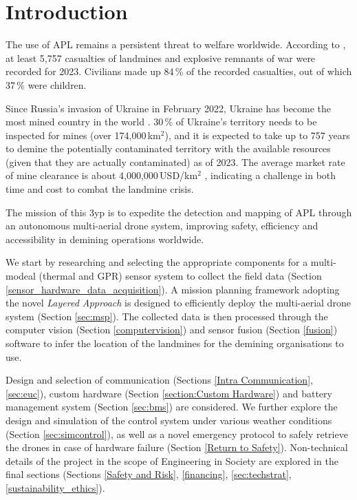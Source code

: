 \section{Introduction} \label{introduction}

The use of \gls{APL} remains a persistent threat to welfare worldwide. According to \cite{icbl2024landmine}, at least 5,757 casualties of landmines and explosive remnants of war were recorded for 2023. Civilians made up 84\,\% of the recorded casualties, out of which 37\,\% were children. 

Since Russia's invasion of Ukraine in February 2022, Ukraine has become the most mined country in the world \cite{globsec2024ukraine}. 30\,\% of Ukraine's territory needs to be inspected for mines (over 174,000\,km$^2$), and it is expected to take up to 757 years to demine the potentially contaminated territory with the available resources (given that they are actually contaminated) as of 2023. The average market rate of mine clearance is about 4,000,000\,USD/km$^2$ \cite{globsec2023ukraine}, indicating a challenge in both time and cost to combat the landmine crisis. 

The mission of this \gls{3yp} is to expedite the detection and mapping of \gls{APL} through an autonomous multi-aerial drone system, improving safety, efficiency and accessibility in demining operations worldwide. 

We start by researching and selecting the appropriate components for a multi-modeal (thermal and \gls{GPR}) sensor system to collect the field data (Section \ref{sensor_hardware_data_acquisition}). A mission planning framework adopting the novel \textit{Layered Approach} is designed to efficiently deploy the multi-aerial drone system (Section \ref{sec:msp}). The collected data is then processed through the computer vision (Section \ref{computervision}) and sensor fusion (Section \ref{fusion}) software to infer the location of the landmines for the demining organisations to use. 

Design and selection of communication (Sections \ref{Intra Communication}, \ref{sec:euc}), custom hardware (Section \ref{section:Custom Hardware}) and battery management system (Section \ref{sec:bms}) are considered. We further explore the design and simulation of the control system under various weather conditions (Section \ref{sec:simcontrol}), as well as a novel emergency protocol to safely retrieve the drones in case of hardware failure (Section \ref{Return to Safety}). Non-technical details of the project in the scope of Engineering in Society are explored in the final sections (Sections \ref{Safety and Risk}, \ref{financing}, \ref{sec:techstrat}, \ref{sustainability_ethics}). 


